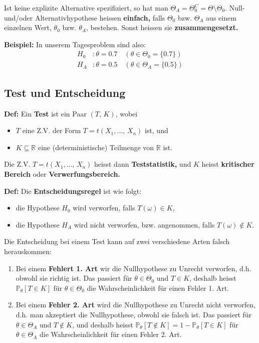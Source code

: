 \documentclass[a4paper]{extarticle}
\begin{document}
Ist keine explizite Alternative spezifiziert, so hat man $\Theta_A = \Theta_0^C = \Theta \setminus \Theta_0$. Null- und/oder Alternativhypothese heissen \textbf{einfach,} falls $\Theta_0$ bzw. $\Theta_A$ aus einem einzelnen Wert, $\theta_0$ bzw. $\theta_A$, bestehen. Sonst heissen sie \textbf{zusammengesetzt.}

\begin{ebox}
    \textbf{Beispiel:} In unserem Tagesproblem sind also:
    \begin{align*}
        H_0 &: \theta = 0.7 \quad (\theta \in \Theta_0 = \{0.7\})\\
        H_A &: \theta = 0.5 \quad (\theta \in \Theta_A = \{0.5\})
    \end{align*}
\end{ebox}

\subsection{Test und Entscheidung}

\textbf{Def:} Ein \textbf{Test} ist ein Paar $(T, \, K)$, wobei
\begin{itemize}
    \item $T$ eine Z.V. der Form $T = t(X_1,..., \, X_n)$ ist, und
    \item $K \subseteq \mathbb{R}$ eine (deterministische) Teilmenge von $\mathbb{R}$ ist.
\end{itemize}
Die Z.V. $T = t(X_1,..., \, X_n)$ heisst dann \textbf{Teststatistik,} und $K$ heisst \textbf{kritischer Bereich} oder \textbf{Verwerfungsbereich.}

\textbf{Def:} Die \textbf{Entscheidungsregel} ist wie folgt:
\begin{itemize}
    \item die Hypothese $H_0$ wird verworfen, falls $T(\omega) \in K$,
    \item die Hypothese $H_A$ wird nicht verworfen, bzw. angenommen, falls $T(\omega) \notin K$.
\end{itemize}

Die Entscheidung bei einem Test kann auf zwei verschiedene Arten falsch herauskommen:
\begin{enumerate}
    \item Bei einem \textbf{Fehlert 1. Art} wir die Nullhypothese zu Unrecht verworfen, d.h. obwohl sie richtig ist. Das passiert für $\theta \in \Theta_0$ und $T \in K$, deshalb heisst $\mathbb{P}_{\theta}[T \in K]$ für $\theta \in \Theta_0$ die Wahrscheinlichkeit für einen Fehler 1. Art.
    \item Bei einem \textbf{Fehler 2. Art} wird die Nullhypothese zu Unrecht nicht verworfen, d.h. man akzeptiert die Nullhypothese, obwohl sie falsch ist. Das passiert für $\theta \in \Theta_A$ und $T \notin K$, und deshalb heisst $\mathbb{P}_{\theta}[T \notin K] = 1 - \mathbb{P}_{\theta}[T \in K]$ für $\theta \in \Theta_A$ die Wahrscheinlichkeit für einen Fehler 2. Art.
\end{enumerate}
\end{document}

